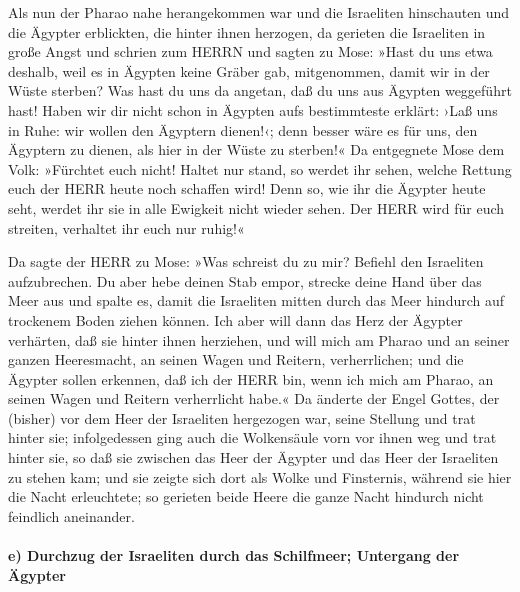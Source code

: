  Als nun der Pharao nahe herangekommen war und die
Israeliten hinschauten und die Ägypter erblickten, die hinter ihnen
herzogen, da gerieten die Israeliten in große Angst und schrien zum
HERRN  und sagten zu Mose: »Hast du uns etwa deshalb,
weil es in Ägypten keine Gräber gab, mitgenommen, damit wir in der Wüste
sterben? Was hast du uns da angetan, daß du uns aus Ägypten weggeführt
hast!  Haben wir dir nicht schon in Ägypten aufs
bestimmteste erklärt: ›Laß uns in Ruhe: wir wollen den Ägyptern
dienen!‹; denn besser wäre es für uns, den Ägyptern zu dienen, als hier
in der Wüste zu sterben!«  Da entgegnete Mose dem Volk:
»Fürchtet euch nicht! Haltet nur stand, so werdet ihr sehen, welche
Rettung euch der HERR heute noch schaffen wird! Denn so, wie ihr die
Ägypter heute seht, werdet ihr sie in alle Ewigkeit nicht wieder sehen.
 Der HERR wird für euch streiten, verhaltet ihr euch nur
ruhig!«

 Da sagte der HERR zu Mose: »Was schreist du zu mir?
Befiehl den Israeliten aufzubrechen.  Du aber hebe deinen
Stab empor, strecke deine Hand über das Meer aus und spalte es, damit
die Israeliten mitten durch das Meer hindurch auf trockenem Boden ziehen
können.  Ich aber will dann das Herz der Ägypter
verhärten, daß sie hinter ihnen herziehen, und will mich am Pharao und
an seiner ganzen Heeresmacht, an seinen Wagen und Reitern,
verherrlichen;  und die Ägypter sollen erkennen, daß ich
der HERR bin, wenn ich mich am Pharao, an seinen Wagen und Reitern
verherrlicht habe.«  Da änderte der Engel Gottes, der
(bisher) vor dem Heer der Israeliten hergezogen war, seine Stellung und
trat hinter sie; infolgedessen ging auch die Wolkensäule vorn vor ihnen
weg und trat hinter sie,  so daß sie zwischen das Heer
der Ägypter und das Heer der Israeliten zu stehen kam; und sie zeigte
sich dort als Wolke und Finsternis, während sie hier die Nacht
erleuchtete; so gerieten beide Heere die ganze Nacht hindurch nicht
feindlich aneinander.

\hypertarget{e-durchzug-der-israeliten-durch-das-schilfmeer-untergang-der-uxe4gypter}{%
\paragraph{e) Durchzug der Israeliten durch das Schilfmeer; Untergang
der
Ägypter}\label{e-durchzug-der-israeliten-durch-das-schilfmeer-untergang-der-uxe4gypter}}

